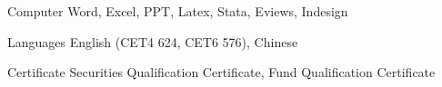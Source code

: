 


\begin{cvskills}


\cvskill
{Computer} %
{Word, Excel, PPT, Latex, Stata, Eviews, Indesign} %



\cvskill
{Languages} %
{English (CET4 624, CET6 576), Chinese} %

\cvskill
{Certificate}
{Securities Qualification Certificate, 
Fund Qualification Certificate}

\end{cvskills}